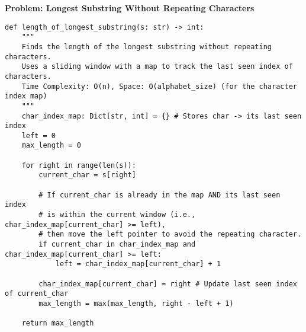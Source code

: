 \noindent\textbf{Problem: Longest Substring Without Repeating Characters}
\begin{verbatim}
def length_of_longest_substring(s: str) -> int:
    """
    Finds the length of the longest substring without repeating characters.
    Uses a sliding window with a map to track the last seen index of characters. 
    Time Complexity: O(n), Space: O(alphabet_size) (for the character index map)
    """
    char_index_map: Dict[str, int] = {} # Stores char -> its last seen index
    left = 0
    max_length = 0

    for right in range(len(s)):
        current_char = s[right]
        
        # If current_char is already in the map AND its last seen index
        # is within the current window (i.e., char_index_map[current_char] >= left),
        # then move the left pointer to avoid the repeating character.
        if current_char in char_index_map and char_index_map[current_char] >= left:
            left = char_index_map[current_char] + 1
        
        char_index_map[current_char] = right # Update last seen index of current_char
        max_length = max(max_length, right - left + 1)
        
    return max_length
\end{verbatim}

